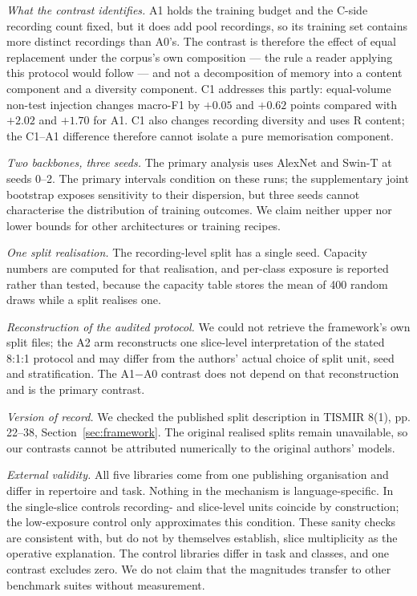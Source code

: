 \emph{What the contrast identifies.} A1 holds the training budget and the C-side recording
count fixed, but it does add pool recordings, so its training set contains more distinct
recordings than A0's. The contrast is therefore the effect of equal replacement under the
corpus's own composition --- the rule a reader applying this protocol would follow --- and not a
decomposition of memory into a content component and a diversity component. C1 addresses this
partly: equal-volume non-test injection changes macro-F1 by $+0.05$ and $+0.62$ points compared
with $+2.02$ and $+1.70$ for A1. C1 also changes recording diversity and uses R content; the
C1--A1 difference therefore cannot isolate a pure memorisation component.

\emph{Two backbones, three seeds.} The primary analysis uses AlexNet and Swin-T at seeds
0--2. The primary intervals condition on these runs; the supplementary joint bootstrap exposes
sensitivity to their dispersion, but three seeds cannot characterise the distribution of training
outcomes. We claim neither upper nor lower bounds for other architectures or training recipes.

\emph{One split realisation.} The recording-level split has a single seed. Capacity numbers are
computed for that realisation, and per-class exposure is reported rather than tested, because
the capacity table stores the mean of 400 random draws while a split realises one.

\emph{Reconstruction of the audited protocol.} We could not retrieve the framework's own split
files; the A2 arm reconstructs one slice-level interpretation of the stated 8:1:1 protocol and
may differ from the authors' actual choice of split unit, seed and stratification. The A1$-$A0
contrast does not depend on that reconstruction and is the primary contrast.

\emph{Version of record.} We checked the published split description in TISMIR 8(1),
pp. 22--38, Section~\ref{sec:framework}. The original realised splits remain unavailable, so
our contrasts cannot be attributed numerically to the original authors' models.

\emph{External validity.} All five libraries come from one publishing organisation and differ in repertoire and task.
Nothing in the
mechanism is language-specific. In the single-slice controls recording- and slice-level units
coincide by construction; the low-exposure control only approximates this condition. These
sanity checks are consistent with, but do not by themselves establish, slice multiplicity as the
operative explanation. The control libraries differ in task and classes, and one contrast excludes
zero. We do not claim that the magnitudes transfer to other benchmark suites without measurement.
